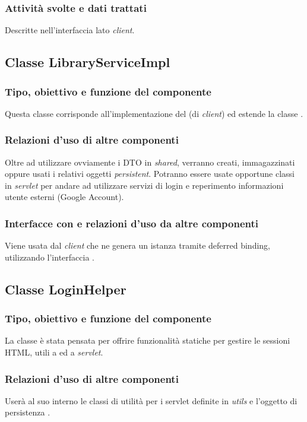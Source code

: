 \subsubsection*{Attivit\`a svolte e dati trattati}
Descritte nell'interfaccia lato \emph{client}.

\subsection{Classe LibraryServiceImpl}
\subsubsection*{Tipo, obiettivo e funzione del componente}
Questa classe corrisponde all'implementazione del  (di
\emph{client}) ed estende la classe .
\subsubsection*{Relazioni d'uso di altre componenti}
Oltre ad utilizzare ovviamente i DTO in \emph{shared}, verranno creati,
immagazzinati oppure usati i relativi oggetti \emph{persistent}.
Potranno essere usate opportune classi in \emph{servlet} per andare ad
utilizzare servizi di login e reperimento informazioni utente esterni (Google
Account).
\subsubsection*{Interfacce con e relazioni d'uso da altre componenti}
Viene usata dal \emph{client} che ne genera un istanza tramite deferred binding,
utilizzando l'interfaccia .

\subsection{Classe LoginHelper}
\subsubsection*{Tipo, obiettivo e funzione del componente}
La classe  \`e stata pensata per offrire funzionalit\`a statiche
per gestire le sessioni HTML, utili a  ed a \emph{servlet}.

\subsubsection*{Relazioni d'uso di altre componenti}
User\`a al suo interno le classi di utilit\`a per i servlet definite in
\emph{utils} e l'oggetto di persistenza .


